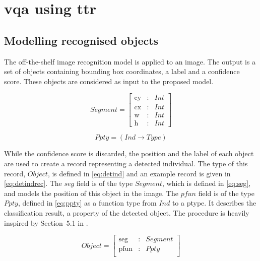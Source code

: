 \documentclass[11pt, a4paper]{article}
\begin{document}
\section{\Gls{vqa} using \gls{ttr}}

\subsection{Modelling recognised objects}

The off-the-shelf image recognition model is applied to an image.
The output is a set of objects containing bounding box coordinates, a label and a confidence score.
These objects are considered as input to the proposed model.

\begin{equation}\label{eq:seg}
Segment = \left[\begin{array}{rcl}
\text{cy} &:& Int\\
\text{cx} &:& Int\\
\text{w} &:& Int\\
\text{h} &:& Int
\end{array}\right]\end{equation}

\begin{equation}\label{eq:ppty}
Ppty = (Ind\rightarrow Type)\end{equation}

While the confidence score is discarded, the position and the label of each object are used to create a record representing a detected individual.
The type of this record, $Object$, is defined in \autoref{eq:detind} and an example record is given in \autoref{eq:detindrec}.
The $seg$ field is of the type $Segment$, which is defined in \autoref{eq:seg}, and models the position of this object in the image.
The $pfun$ field is of the type $Ppty$, defined in \autoref{eq:ppty} as a function type from $Ind$ to a ptype.
It describes the classification result, a property of the detected object.
The procedure is heavily inspired by Section~5.1 in \cite{DobnikInterfacinglanguagespatial2017}.

\begin{equation}\label{eq:detind}
Object = \left[\begin{array}{rcl}
\text{seg} &:& Segment\\
\text{pfun} &:& Ppty \\
\end{array}\right]\end{equation}
\end{document}
